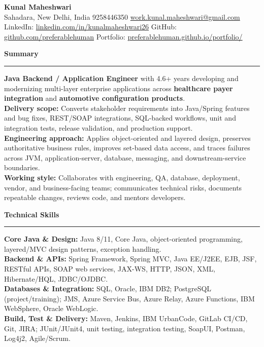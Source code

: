 \documentclass[11pt,letterpaper]{article}
\newcommand{\ressection}[1]{\Needspace{6\baselineskip}\vspace{8pt}\par\textbf{#1}\par\vspace{2pt}\hrule\vspace{5pt}}
\begin{document}
\pagestyle{empty}\raggedright\fontsize{11}{12.5}\selectfont

{\Large \textbf{Kunal Maheshwari}}\\
Sahadara, New Delhi, India \textbar{} 9258446350 \textbar{} \href{mailto:work.kunal.maheshwari@gmail.com}{work.kunal.maheshwari@gmail.com}\\
LinkedIn: \href{https://www.linkedin.com/in/kunalmaheshwari26}{linkedin.com/in/kunalmaheshwari26} \textbar{} GitHub: \href{https://github.com/preferablehuman}{github.com/preferablehuman} \textbar{} Portfolio: \href{https://preferablehuman.github.io/portfolio/}{preferablehuman.github.io/portfolio/}

\ressection{Summary}
\textbf{Java Backend / Application Engineer} with 4.6+ years developing and modernizing multi-layer enterprise applications across \textbf{healthcare payer integration} and \textbf{automotive configuration products}.\\[2pt]
\textbf{Delivery scope:} Converts stakeholder requirements into Java/Spring features and bug fixes, REST/SOAP integrations, SQL-backed workflows, unit and integration tests, release validation, and production support.\\[2pt]
\textbf{Engineering approach:} Applies object-oriented and layered design, preserves authoritative business rules, improves set-based data access, and traces failures across JVM, application-server, database, messaging, and downstream-service boundaries.\\[2pt]
\textbf{Working style:} Collaborates with engineering, QA, database, deployment, vendor, and business-facing teams; communicates technical risks, documents repeatable changes, reviews code, and mentors developers.

\ressection{Technical Skills}
\textbf{Core Java \& Design:} Java 8/11, Core Java, object-oriented programming, layered/MVC design patterns, exception handling.\\
\textbf{Backend \& APIs:} Spring Framework, Spring MVC, Java EE/J2EE, EJB, JSF, RESTful APIs, SOAP web services, JAX-WS, HTTP, JSON, XML, Hibernate/HQL, JDBC/OJDBC.\\
\textbf{Databases \& Integration:} SQL, Oracle, IBM DB2; PostgreSQL (project/training); JMS, Azure Service Bus, Azure Relay, Azure Functions, IBM WebSphere, Oracle WebLogic.\\
\textbf{Build, Test \& Delivery:} Maven, Jenkins, IBM UrbanCode, GitLab CI/CD, Git, JIRA; JUnit/JUnit4, unit testing, integration testing, SoapUI, Postman, Log4j2, Agile/Scrum.
\end{document}
